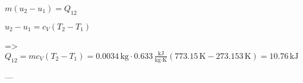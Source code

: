 \( m (u_2 - u_1) = Q_{12} \)  

\( u_2 - u_1 = c_{V} (T_2 - T_1) \)  

=> \( Q_{12} = m c_{V} (T_2 - T_1) = 0.0034 \, \text{kg} \cdot 0.633 \, \frac{\text{kJ}}{\text{kg·K}} (773.15 \, \text{K} - 273.153 \, \text{K}) = 10.76 \, \text{kJ} \)  

---